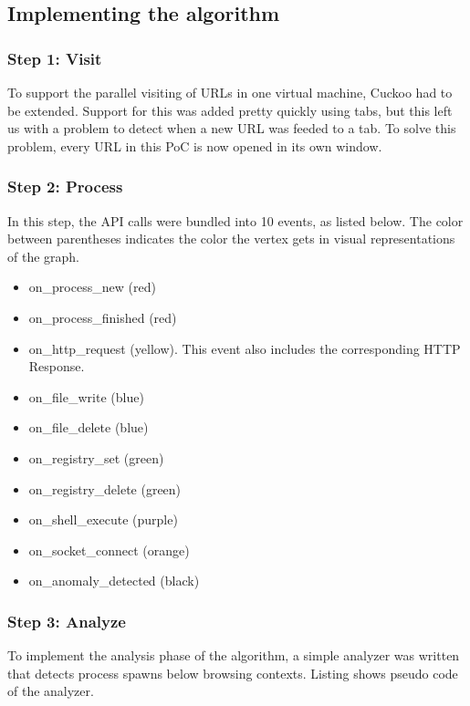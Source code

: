 
\subsection{Implementing the algorithm}

\subsubsection{Step 1: Visit}

To support the parallel visiting of URLs in one virtual machine, Cuckoo had to be extended. Support for this was added pretty quickly using tabs, but this left us with a problem to detect when a new URL was feeded to a tab. To solve this problem, every URL in this PoC is now opened in its own window.

\subsubsection{Step 2: Process}

In this step, the API calls were bundled into 10 events, as listed below. The color between parentheses indicates the color the vertex gets in visual representations of the graph.
\begin{itemize}
\item on\_process\_new (red)
\item on\_process\_finished (red)
\item on\_http\_request (yellow). This event also includes the corresponding HTTP Response.
\item on\_file\_write (blue) 
\item on\_file\_delete (blue) 
\item on\_registry\_set (green)
\item on\_registry\_delete (green)
\item on\_shell\_execute (purple)
\item on\_socket\_connect (orange)
\item on\_anomaly\_detected (black)
\end{itemize}

\subsubsection{Step 3: Analyze}

To implement the analysis phase of the algorithm, a simple analyzer was written that detects process spawns below browsing contexts. Listing  shows pseudo code of the analyzer.


